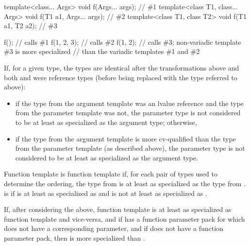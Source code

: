 \documentclass{wg21}
\begin{document}
\begin{example}
    \begin{codeblock}
        template<class... Args>              void f(Args... args);        // \#1
        template<class T1, class... Args>    void f(T1 a1, Args... args); // \#2
        template<class T1, class T2>         void f(T1 a1, T2 a2);        // \#3

        f();                // calls \#1
        f(1, 2, 3);         // calls \#2
        f(1, 2);            // calls \#3; non-variadic template \#3 is more specialized
        // than the variadic templates \#1 and \#2
    \end{codeblock}
\end{example}

If, for a given type, the
types are identical after the transformations above
and both  and  were reference types (before being replaced with the
type referred to above):
\begin{itemize}
    \item if the type from the argument template was an lvalue reference and the type
    from the parameter template was not,
    the parameter type is not considered to be
    at least as specialized as the argument type; otherwise,
    \item if the type from
    the argument template is more cv-qualified than the type from the
    parameter template (as described above),
    the parameter type is not considered to be
    at least as specialized as the argument type.
\end{itemize}

\pnum
{}%
Function template 
is 
function template  if,
for each pair of types used to determine the ordering,
the type from 
is at least as specialized as
the type from .
is 
 if
is at least as specialized as
 and
is not at least as specialized as
.

\pnum
If, after considering the above, function template 
is at least as specialized as function template  and vice-versa, and
if  has a  function parameter pack
for which  does not have a corresponding parameter, and
if  does not have a  function parameter pack,
then  is more specialized than .
\end{document}
